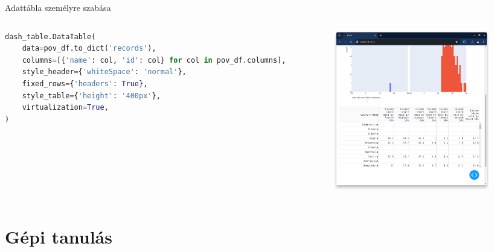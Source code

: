 \documentclass[english, aspectratio=169]{beamer}
\makeatletter
\let\origtableofcontents=\tableofcontents
\def\tableofcontents{\@ifnextchar[{\origtableofcontents}{\gobbletableofcontents}}
\def\gobbletableofcontents#1{\origtableofcontents}
\makeatother
\begin{document}
\begin{frame}[fragile]{Adattábla személyre szabása}
	\begin{columns}
		\begin{column}{.5\textwidth}
			\begin{lstlisting}[language=python]
dash_table.DataTable(
	data=pov_df.to_dict('records'),
	columns=[{'name': col, 'id': col} for col in pov_df.columns],
	style_header={'whiteSpace': 'normal'},
	fixed_rows={'headers': True},
	style_table={'height': '400px'},
	virtualization=True,   
)
			\end{lstlisting}
		\end{column}
		\begin{column}{.5\textwidth}
			\begin{center}
				\includegraphics[width=7cm, height=7cm, keepaspectratio]{images/freq_13.png}
			\end{center}
		\end{column}
	\end{columns}
\end{frame}

\section{Gépi tanulás}

\begin{frame}{}
	\tableofcontents[currentsection]
\end{frame}
\end{document}

